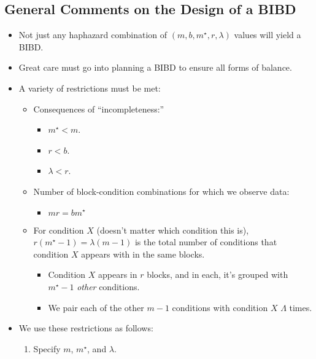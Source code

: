 \subsection{General Comments on the Design of a BIBD}
\begin{itemize}
    \item Not just any haphazard combination of $ (m,b,m^\star,r,\lambda) $ values will yield a BIBD\@.
    \item Great care must go into planning a BIBD to ensure all forms of balance.
    \item A variety of restrictions must be met:
          \begin{itemize}
              \item Consequences of ``incompleteness:''
                    \begin{itemize}
                        \item $ m^\star<m $.
                        \item $ r<b $.
                        \item $ \lambda<r $.
                    \end{itemize}
              \item Number of block-condition combinations for which we observe data:
                    \begin{itemize}
                        \item $ mr=bm^\star $
                    \end{itemize}
              \item For condition $ X $ (doesn't matter which condition this is), $ r(m^\star-1)=\lambda(m-1) $ is the
                    total number of conditions that condition $ X $ appears with in the same blocks.
                    \begin{itemize}
                        \item Condition $ X $ appears in $ r $ blocks, and in each, it's grouped with $ m^\star-1 $ \emph{other} conditions.
                        \item We pair each of the other $ m-1 $ conditions with condition $ X $ $ \Lambda $ times.
                    \end{itemize}
          \end{itemize}
    \item We use these restrictions as follows:
          \begin{enumerate}
              \item Specify $ m $, $ m^\star $, and $ \lambda $.

\end{enumerate}
\end{itemize}
